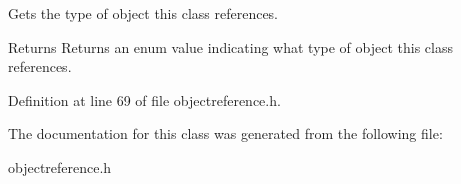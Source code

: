 Gets the type of object this class references. 

\begin{DoxyReturn}{Returns}
Returns an enum value indicating what type of object this class references. 
\end{DoxyReturn}


Definition at line 69 of file objectreference.h.



The documentation for this class was generated from the following file:\begin{DoxyCompactItemize}
\item 
objectreference.h\end{DoxyCompactItemize}
